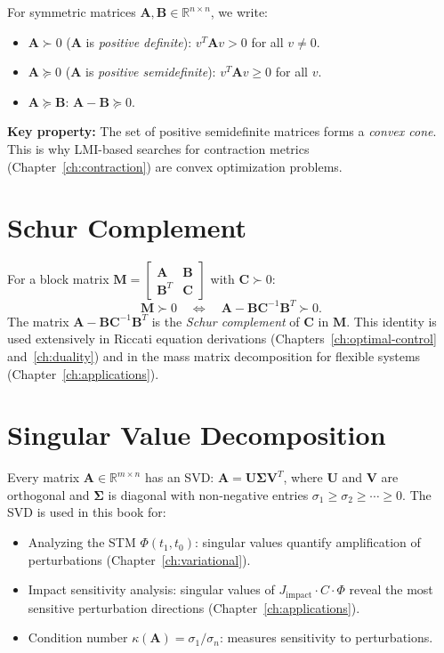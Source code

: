\documentclass[11pt,letterpaper,openany]{book}
\theoremstyle{plain}
\theoremstyle{definition}
\theoremstyle{remark}
\newcommand{\R}{\mathbb{R}}
\newcommand{\mat}[1]{\mathbf{#1}}
\begin{document}
For symmetric matrices $\mat{A}, \mat{B} \in \R^{n \times n}$, we write:
\begin{itemize}
\item $\mat{A} \succ 0$ ($\mat{A}$ is \emph{positive definite}): $v^T\mat{A}v > 0$ for all $v \neq 0$.
\item $\mat{A} \succeq 0$ ($\mat{A}$ is \emph{positive semidefinite}): $v^T\mat{A}v \geq 0$ for all $v$.
\item $\mat{A} \succeq \mat{B}$: $\mat{A} - \mat{B} \succeq 0$.
\end{itemize}

\textbf{Key property:} The set of positive semidefinite matrices forms a \emph{convex cone}.
This is why LMI-based searches for contraction metrics (Chapter~\ref{ch:contraction}) are
convex optimization problems.

\section{Schur Complement}

For a block matrix $\mat{M} = \begin{bmatrix} \mat{A} & \mat{B} \\ \mat{B}^T & \mat{C} \end{bmatrix}$
with $\mat{C} \succ 0$:
\begin{equation}
\mat{M} \succ 0 \quad \Leftrightarrow \quad \mat{A} - \mat{B}\mat{C}^{-1}\mat{B}^T \succ 0.
\end{equation}
The matrix $\mat{A} - \mat{B}\mat{C}^{-1}\mat{B}^T$ is the \emph{Schur complement} of $\mat{C}$
in $\mat{M}$. This identity is used extensively in Riccati equation derivations
(Chapters~\ref{ch:optimal-control} and~\ref{ch:duality}) and in the mass matrix decomposition
for flexible systems (Chapter~\ref{ch:applications}).

\section{Singular Value Decomposition}

Every matrix $\mat{A} \in \R^{m \times n}$ has an SVD: $\mat{A} = \mat{U}\mat{\Sigma}\mat{V}^T$,
where $\mat{U}$ and $\mat{V}$ are orthogonal and $\mat{\Sigma}$ is diagonal with non-negative
entries $\sigma_1 \geq \sigma_2 \geq \cdots \geq 0$. The SVD is used in this book for:
\begin{itemize}
\item Analyzing the STM $\Phi(t_1, t_0)$: singular values quantify amplification of
      perturbations (Chapter~\ref{ch:variational}).
\item Impact sensitivity analysis: singular values of $J_{\text{impact}} \cdot C \cdot \Phi$
      reveal the most sensitive perturbation directions (Chapter~\ref{ch:applications}).
\item Condition number $\kappa(\mat{A}) = \sigma_1/\sigma_n$: measures sensitivity to
      perturbations.
\end{itemize}
\end{document}
